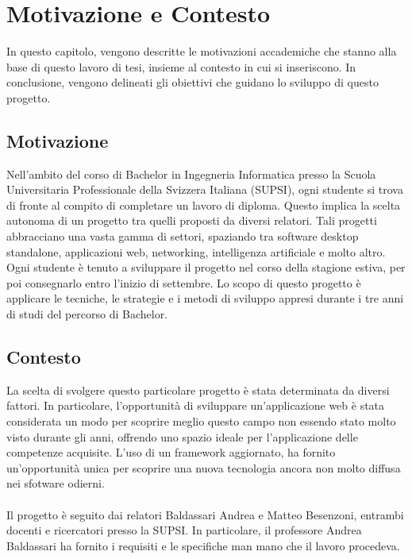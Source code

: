 \documentclass[twoside]{supsistudent}
\begin{document}
\chapter{Motivazione e Contesto}

In questo capitolo, vengono descritte le motivazioni accademiche che stanno alla base di
questo lavoro di tesi, insieme al contesto in cui si inseriscono. In conclusione, vengono
delineati gli obiettivi che guidano lo sviluppo di questo progetto.

\section{Motivazione}
Nell'ambito del corso di Bachelor in Ingegneria Informatica presso la Scuola Universitaria
Professionale della Svizzera Italiana (SUPSI), ogni studente si trova di fronte al compito di
completare un lavoro di diploma. Questo implica la scelta autonoma di un progetto tra quelli
proposti da diversi relatori. Tali progetti abbracciano una vasta gamma di settori, spaziando
tra software desktop standalone, applicazioni web, networking, intelligenza artificiale e molto
altro. Ogni studente è tenuto a sviluppare il progetto nel corso della stagione estiva, per poi
consegnarlo entro l'inizio di settembre. Lo scopo di questo progetto è applicare le tecniche,
le strategie e i metodi di sviluppo appresi durante i tre anni di studi del percorso di Bachelor.

\section{Contesto}
La scelta di svolgere questo particolare progetto è stata determinata da diversi fattori. In
particolare, l'opportunità di sviluppare un'applicazione web è stata considerata un modo
per scoprire meglio questo campo non essendo stato molto visto durante gli anni, offrendo
uno spazio ideale per l'applicazione delle competenze acquisite. L'uso di un framework
aggiornato, ha fornito un'opportunità unica per scoprire una nuova tecnologia ancora non molto
diffusa nei sfotware odierni.\\
\\
Il progetto è seguito dai relatori Baldassari Andrea e Matteo Besenzoni, entrambi docenti e ricercatori presso la SUPSI. In particolare, il professore Andrea Baldassari ha fornito i requisiti e le specifiche man mano che il lavoro procedeva.
\end{document}
